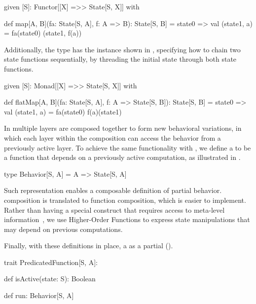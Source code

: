 \begin{scala}[label=lst:state-functor, caption=Functor instance for the State type]
 given [S]: Functor[[X] =>> State[S, X]] with

  def map[A, B](fa: State[S, A], f: A => B): State[S, B] =
    state0 =>
      val (state1, a) = fa(state0)
      (state1, f(a))

\end{scala}

Additionally, the  type has the  instance shown in , 
specifying how to chain two state functions sequentially, by threading the initial state through both 
state functions.

\begin{scala}[label=lst:state-monad, caption=Monad instance for the State type]
given [S]: Monad[[X] =>> State[S, X]] with

  def flatMap[A, B](fa: State[S, A], f: A => State[S, B]): State[S, B] =
    state0 =>
      val (state1, a) = fa(state0)
      f(a)(state1)

\end{scala}

In  multiple layers are composed together to form new behavioral variations, in which
each layer within the composition can access the behavior from a previously active layer. To achieve 
the same functionality with , we define a  to be a 
 function that depends on a previously active computation, as illustrated in 
.

\begin{scala}[label=lst:behavior, caption=Definition of a \scode{Behavior}]
  type Behavior[S, A] = A => State[S, A]
\end{scala}

Such representation enables a composable definition of partial behavior.  composition is 
translated to function composition, which is easier to implement. Rather than having a special 
 construct that requires access to meta-level information~\cite{cardozo22},
we use Higher-Order Functions to express state manipulations that may depend on previous 
computations.

Finally, with these definitions in place, a  as a partial  
().

\begin{scala}[label=lst:predicated-function, caption=Definition of a \scode{PredicatedFunction}]
 trait PredicatedFunction[S, A]:

  def isActive(state: S): Boolean

  def run: Behavior[S, A]
\end{scala}

